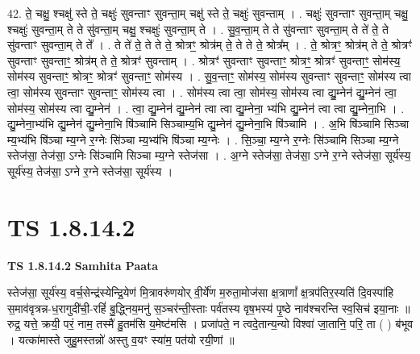 \documentclass[17pt]{extarticle}
\begin{document}
42. ते॒ चक्षु॒ श्चक्षु॑ स्ते ते॒ चक्षुः॑ सुवन्ताꣳ सुवन्ता॒म् चक्षु॑ स्ते ते॒ चक्षुः॑ सुवन्ताम् । . चक्षुः॑ सुवन्ताꣳ सुवन्ता॒म् चक्षु॒ श्चक्षुः॑ सुवन्ता॒म् ते ते सु॑वन्ता॒म् चक्षु॒ श्चक्षुः॑ सुवन्ता॒म् ते । . सु॒व॒न्ता॒म् ते ते सु॑वन्ताꣳ सुवन्ता॒म् ते ते॑ ते॒ ते सु॑वन्ताꣳ सुवन्ता॒म् ते ते᳚ । . ते ते॑ ते॒ ते ते ते॒ श्रोत्रꣳ॒॒ श्रोत्र॑म् ते॒ ते ते ते॒ श्रोत्र᳚म् । . ते॒ श्रोत्रꣳ॒॒ श्रोत्र॑म् ते ते॒ श्रोत्रꣳ॑ सुवन्ताꣳ सुवन्ताꣳ॒॒ श्रोत्र॑म् ते ते॒ श्रोत्रꣳ॑ सुवन्ताम् । . श्रोत्रꣳ॑ सुवन्ताꣳ सुवन्ताꣳ॒॒ श्रोत्रꣳ॒॒ श्रोत्रꣳ॑ सुवन्ताꣳ॒॒ सोम॑स्य॒ सोम॑स्य सुवन्ताꣳ॒॒ श्रोत्रꣳ॒॒ श्रोत्रꣳ॑ सुवन्ताꣳ॒॒ सोम॑स्य । . सु॒व॒न्ताꣳ॒॒ सोम॑स्य॒ सोम॑स्य सुवन्ताꣳ सुवन्ताꣳ॒॒ सोम॑स्य त्वा त्वा॒ सोम॑स्य सुवन्ताꣳ सुवन्ताꣳ॒॒ सोम॑स्य त्वा । . सोम॑स्य त्वा त्वा॒ सोम॑स्य॒ सोम॑स्य त्वा द्यु॒म्नेन॑ द्यु॒म्नेन॑ त्वा॒ सोम॑स्य॒ सोम॑स्य त्वा द्यु॒म्नेन॑ । . त्वा॒ द्यु॒म्नेन॑ द्यु॒म्नेन॑ त्वा त्वा द्यु॒म्नेना॒ भ्य॑भि द्यु॒म्नेन॑ त्वा त्वा द्यु॒म्नेना॒भि । . द्यु॒म्नेना॒भ्य॑भि द्यु॒म्नेन॑ द्यु॒म्नेना॒भि षि॑ञ्चामि सिञ्चाम्य॒भि द्यु॒म्नेन॑ द्यु॒म्नेना॒भि षि॑ञ्चामि । . अ॒भि षि॑ञ्चामि सिञ्चा म्य॒भ्य॑भि षि॑ञ्चा म्य॒ग्ने र॒ग्नेः सि॑ञ्चा म्य॒भ्य॑भि षि॑ञ्चा म्य॒ग्नेः । . सि॒ञ्चा॒ म्य॒ग्ने र॒ग्नेः सि॑ञ्चामि सिञ्चा म्य॒ग्ने स्तेज॑सा॒ तेज॑सा॒ ऽग्नेः सि॑ञ्चामि सिञ्चा म्य॒ग्ने स्तेज॑सा । . अ॒ग्ने स्तेज॑सा॒ तेज॑सा॒ ऽग्ने र॒ग्ने स्तेज॑सा॒ सूर्य॑स्य॒ सूर्य॑स्य॒ तेज॑सा॒ ऽग्ने र॒ग्ने स्तेज॑सा॒ सूर्य॑स्य । \newline
\pagebreak
{}
\section*{ TS 1.8.14.2 }

\textbf{TS 1.8.14.2 } \newline
\textbf{Samhita Paata} \newline

स्तेज॑सा॒ सूर्य॑स्य॒ वर्च॒सेन्द्र॑स्येन्द्रि॒येण॑ मि॒त्रावरु॑णयोर् वी॒र्ये॑ण म॒रुता॒मोज॑सा क्ष॒त्राणां᳚ क्ष॒त्रप॑तिर॒स्यति॑ दि॒वस्पा॑हि स॒माव॑वृत्रन्न-ध॒रागुदी॑ची॒-रहिं॑ बु॒द्ध्निय॒मनु॑ स॒ञ्चर॑न्ती॒स्ताः पर्व॑तस्य वृष॒भस्य॑ पृ॒ष्ठे नाव॑श्चरन्ति स्व॒सिच॑ इया॒नाः ॥ रुद्र॒ यत्ते॒ क्रयी॒ परं॒ नाम॒ तस्मै॑ हु॒तम॑सि य॒मेष्ट॑मसि । प्रजा॑पते॒ न त्वदे॒तान्य॒न्यो विश्वा॑ जा॒तानि॒ परि॒ ता ( ) ब॑भूव । यत्का॑मास्ते जुहु॒मस्तन्नो॑ अस्तु व॒यꣳ स्या॑म॒ पत॑यो रयी॒णां ॥ \newline
\end{document}
